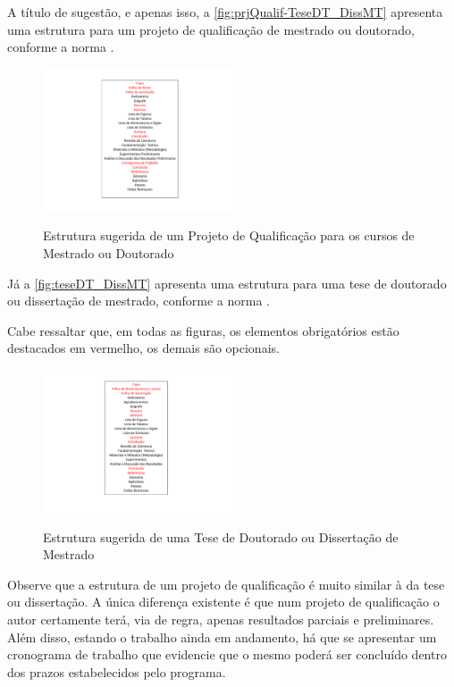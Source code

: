 \begin{apendicesenv}
A título de sugestão, e apenas isso, a \autoref{fig:prjQualif-TeseDT_DissMT} apresenta uma estrutura para um projeto de qualificação de mestrado ou doutorado, conforme a norma .


\begin{figure}[!h]
	\centering
	\caption{Estrutura sugerida de um Projeto de Qualificação para os cursos de Mestrado ou Doutorado}
	\includegraphics[width=0.5\textwidth]{./04-figuras/prjQualif-TeseDT_DissMT}
	\label{fig:prjQualif-TeseDT_DissMT}
\end{figure}


Já a \autoref{fig:teseDT_DissMT} apresenta uma estrutura para uma tese de doutorado ou dissertação de mestrado, conforme a norma .

Cabe ressaltar que, em todas as figuras, os elementos obrigatórios estão destacados em vermelho, os demais são opcionais.


\begin{figure}[!h]
	\centering
	\caption{Estrutura sugerida de uma Tese de Doutorado ou Dissertação de Mestrado}
	\includegraphics[width=0.5\textwidth]{./04-figuras/teseDT_DissMT}
	\label{fig:teseDT_DissMT}
\end{figure}


Observe que a estrutura de um projeto de qualificação é muito similar à da tese ou dissertação. A única diferença existente é que num projeto de qualificação o autor certamente terá, via de regra, apenas resultados parciais e preliminares. Além disso, estando o trabalho ainda em andamento, há que se apresentar um cronograma de trabalho que evidencie que o mesmo poderá ser concluído dentro dos prazos estabelecidos pelo programa.



\end{apendicesenv}

